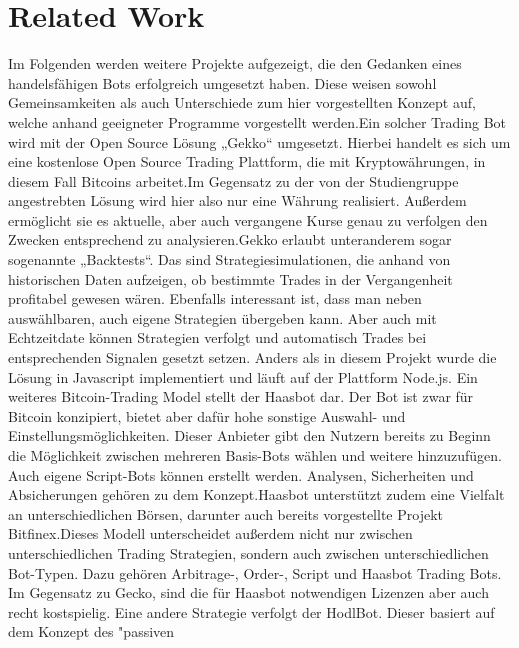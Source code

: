 \documentclass[sigconf]{acmart}
\begin{document}
\section{Related Work}
Im Folgenden werden weitere Projekte aufgezeigt, die den Gedanken eines handelsfähigen Bots
erfolgreich umgesetzt haben. Diese weisen sowohl Gemeinsamkeiten als auch Unterschiede zum hier
vorgestellten Konzept auf, welche anhand geeigneter Programme vorgestellt werden.\newline Ein solcher
Trading Bot wird mit der Open Source Lösung „Gekko“ umgesetzt.
Hierbei handelt es sich um eine kostenlose Open Source Trading Plattform, die mit
Kryptowährungen, in diesem Fall Bitcoins arbeitet.\newline Im Gegensatz zu der von der Studiengruppe
angestrebten Lösung wird hier also nur eine Währung realisiert. Außerdem ermöglicht sie es aktuelle,
aber auch vergangene Kurse genau zu verfolgen den Zwecken entsprechend zu analysieren.\newline Gekko
erlaubt unteranderem sogar sogenannte „Backtests“. Das sind Strategiesimulationen, die anhand von
historischen Daten aufzeigen, ob bestimmte Trades in der Vergangenheit profitabel gewesen wären.
Ebenfalls interessant ist, dass man neben auswählbaren, auch eigene Strategien übergeben kann.\newline
Aber auch mit Echtzeitdate können Strategien verfolgt und automatisch Trades bei entsprechenden
Signalen gesetzt setzen. Anders als in diesem Projekt wurde die Lösung in Javascript implementiert
und läuft auf der Plattform Node.js.
\newline Ein weiteres Bitcoin-Trading Model stellt der Haasbot dar. Der Bot ist zwar für Bitcoin konzipiert,
bietet aber dafür hohe sonstige Auswahl- und Einstellungsmöglichkeiten. Dieser Anbieter gibt den
Nutzern bereits zu Beginn die Möglichkeit zwischen mehreren Basis-Bots wählen und weitere
hinzuzufügen. Auch eigene Script-Bots können erstellt werden. Analysen, Sicherheiten und
Absicherungen gehören zu dem Konzept.Haasbot unterstützt zudem eine Vielfalt an
unterschiedlichen Börsen, darunter auch bereits vorgestellte Projekt Bitfinex.\newline Dieses Modell
unterscheidet außerdem nicht nur zwischen unterschiedlichen Trading Strategien, sondern auch
zwischen unterschiedlichen Bot-Typen. Dazu gehören Arbitrage-, Order-, Script und Haasbot Trading
Bots. Im Gegensatz zu Gecko, sind die für Haasbot notwendigen Lizenzen aber auch recht kostspielig.\newline
Eine andere Strategie verfolgt der HodlBot. Dieser basiert auf dem Konzept des "passiven
\end{document}
